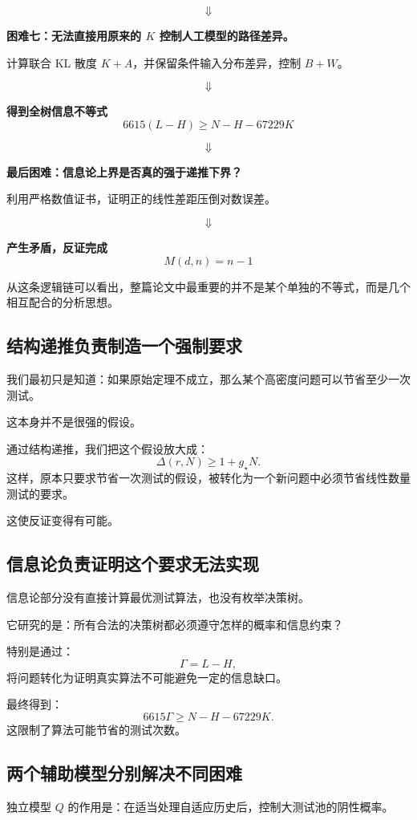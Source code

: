 \documentclass[UTF8,11pt]{ctexart}
\begin{document}
\[\Downarrow\]
\begin{proofbox}
\textbf{困难七：无法直接用原来的 $K$ 控制人工模型的路径差异。}

计算联合 KL 散度 $K+A$，并保留条件输入分布差异，控制 $B+W$。
\end{proofbox}
\[\Downarrow\]
\begin{proofbox}\centering
\textbf{得到全树信息不等式}
\[6615(L-H)\ge N-H-67229K\]
\end{proofbox}
\[\Downarrow\]
\begin{proofbox}
\textbf{最后困难：信息论上界是否真的强于递推下界？}

利用严格数值证书，证明正的线性差距压倒对数误差。
\end{proofbox}
\[\Downarrow\]
\begin{proofbox}\centering
\textbf{产生矛盾，反证完成}
\[\boxed{M(d,n)=n-1}\]
\end{proofbox}

从这条逻辑链可以看出，整篇论文中最重要的并不是某个单独的不等式，而是几个相互配合的分析思想。

\subsection{结构递推负责制造一个强制要求}
我们最初只是知道：如果原始定理不成立，那么某个高密度问题可以节省至少一次测试。

这本身并不是很强的假设。

通过结构递推，我们把这个假设放大成：
\[\Delta(r,N)\ge1+g_\star N.\]
这样，原本只要求节省一次测试的假设，被转化为一个新问题中必须节省线性数量测试的要求。

这使反证变得有可能。

\subsection{信息论负责证明这个要求无法实现}
信息论部分没有直接计算最优测试算法，也没有枚举决策树。

它研究的是：所有合法的决策树都必须遵守怎样的概率和信息约束？

特别是通过：
\[\Gamma=L-H,\]
将问题转化为证明真实算法不可能避免一定的信息缺口。

最终得到：
\[6615\Gamma\ge N-H-67229K.\]
这限制了算法可能节省的测试次数。

\subsection{两个辅助模型分别解决不同困难}
独立模型 $Q$ 的作用是：在适当处理自适应历史后，控制大测试池的阴性概率。
\end{document}
